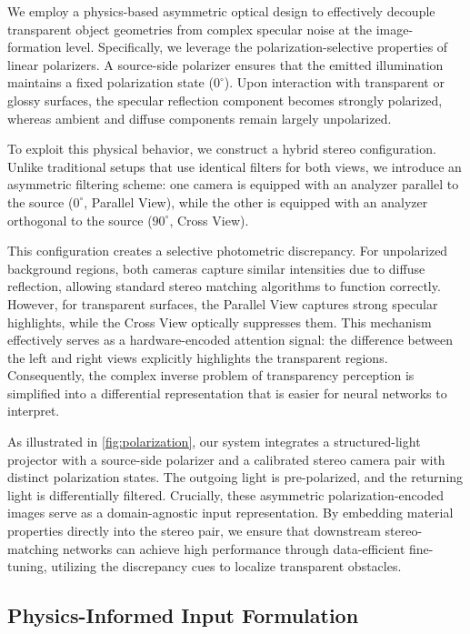 \documentclass[letterpaper, 10 pt, conference]{ieeeconf}  %
\begin{document}
We employ a physics-based asymmetric optical design to effectively decouple transparent object geometries from complex specular noise at the image-formation level. Specifically, we leverage the polarization-selective properties of linear polarizers. A source-side polarizer ensures that the emitted illumination maintains a fixed polarization state ($0^\circ$). Upon interaction with transparent or glossy surfaces, the specular reflection component becomes strongly polarized, whereas ambient and diffuse components remain largely unpolarized.

To exploit this physical behavior, we construct a hybrid stereo configuration. Unlike traditional setups that use identical filters for both views, we introduce an asymmetric filtering scheme: one camera is equipped with an analyzer parallel to the source ($0^\circ$, Parallel View), while the other is equipped with an analyzer orthogonal to the source ($90^\circ$, Cross View).

This configuration creates a selective photometric discrepancy. For unpolarized background regions, both cameras capture similar intensities due to diffuse reflection, allowing standard stereo matching algorithms to function correctly. However, for transparent surfaces, the Parallel View captures strong specular highlights, while the Cross View optically suppresses them. This mechanism effectively serves as a hardware-encoded attention signal: the difference between the left and right views explicitly highlights the transparent regions. Consequently, the complex inverse problem of transparency perception is simplified into a differential representation that is easier for neural networks to interpret.

As illustrated in \cref{fig:polarization}, our system integrates a structured-light projector with a source-side polarizer and a calibrated stereo camera pair with distinct polarization states. The outgoing light is pre-polarized, and the returning light is differentially filtered. Crucially, these asymmetric polarization-encoded images serve as a domain-agnostic input representation. By embedding material properties directly into the stereo pair, we ensure that downstream stereo-matching networks can achieve high performance through data-efficient fine-tuning, utilizing the discrepancy cues to localize transparent obstacles.

\subsection{\textbf{Physics-Informed Input Formulation}}
\end{document}
